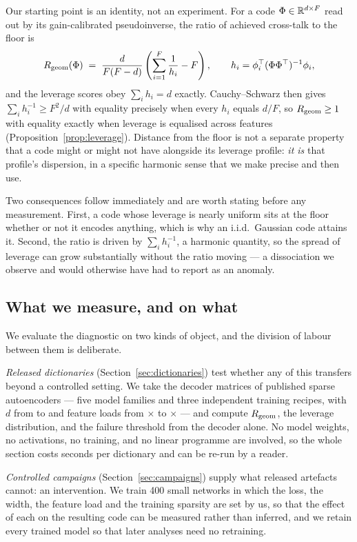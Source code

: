 Our starting point is an identity, not an experiment. For a code $\Phi\in\mathbb{R}^{d\times F}$ read out by
its gain-calibrated pseudoinverse, the ratio of achieved cross-talk to the floor is
\[
  R_{\mathrm{geom}}(\Phi)\;=\;\frac{d}{F(F-d)}\left(\sum_{i=1}^{F}\frac{1}{h_i}-F\right),
  \qquad h_i=\phi_i^{\top}(\Phi\Phi^{\top})^{-1}\phi_i ,
\]
and the leverage scores obey $\sum_i h_i=d$ exactly. Cauchy--Schwarz then gives
$\sum_i h_i^{-1}\ge F^2/d$ with equality precisely when every $h_i$ equals $d/F$, so
$R_{\mathrm{geom}}\ge1$ with equality exactly when leverage is equalised across features
(Proposition~\ref{prop:leverage}). Distance from the floor is not a separate property that a code
might or might not have alongside its leverage profile: \emph{it is} that profile's dispersion, in a
specific harmonic sense that we make precise and then use.

Two consequences follow immediately and are worth stating before any measurement. First, a code whose
leverage is nearly uniform sits at the floor whether or not it encodes anything, which is why an
i.i.d.\ Gaussian code attains it. Second, the ratio is driven by $\sum_i h_i^{-1}$, a harmonic
quantity, so the spread of leverage can grow substantially without the ratio moving --- a
dissociation we observe and would otherwise have had to report as an anomaly.

\subsection{What we measure, and on what}

We evaluate the diagnostic on two kinds of object, and the division of labour between them is
deliberate.

\emph{Released dictionaries} (Section~\ref{sec:dictionaries}) test whether any of this transfers
beyond a controlled setting. We take the decoder matrices of \SaeDicts{} published sparse
autoencoders --- five model families and three independent training recipes, with $d$ from \SaeDMin{}
to \SaeDMax{} and feature loads from \SaeLoadMin$\times$ to \SaeLoadMax$\times$ --- and compute
$R_{\mathrm{geom}}$, the leverage distribution, and the failure threshold from the decoder alone. No model
weights, no activations, no training, and no linear programme are involved, so the whole section
costs seconds per dictionary and can be re-run by a reader.

\emph{Controlled campaigns} (Section~\ref{sec:campaigns}) supply what released artefacts cannot: an
intervention. We train 400 small networks in which the loss, the width, the feature load and the
training sparsity are set by us, so that the effect of each on the resulting code can be measured
rather than inferred, and we retain every trained model so that later analyses need no retraining.

